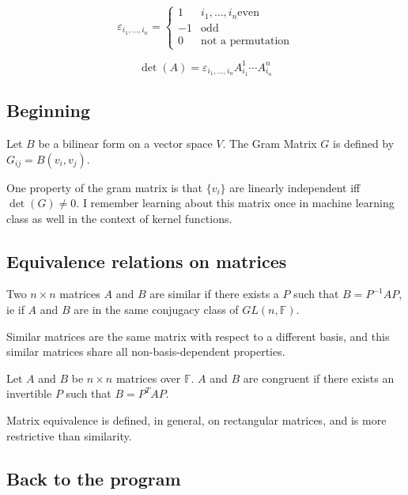 \documentclass[12pt,letterpaper,titlepage,twoside]{article}
\begin{document}
\begin{definition}
  \[ε_{i_1,…,i_n}=\begin{cases}1 & i_1,…,i_n \text{even} \\ -1 & \text{odd} \\ 0 & \text{not a permutation}\end{cases}\]
\end{definition}

\begin{example}
  \[\det(A)=ε_{i_1,…,i_n}A^1_{i_1}⋯ A^n_{i_n}\]
\end{example}

\subsection{Beginning}

\begin{definition}
Let $B$ be a bilinear form on a vector space $V$.
The Gram Matrix $G$ is defined by $G_{ij}=B(v_i,v_j)$.
\end{definition}

One property of the gram matrix is that $\{v_i\}$ are linearly independent iff $\det(G)≠0$.
I remember learning about this matrix once in machine learning class as well in the context of kernel functions.

\subsection{Equivalence relations on matrices}

\begin{definition}
Two $n×n$ matrices $A$ and $B$ are similar if there exists a $P$ such that $B=P^{-1}AP$, ie if $A$ and $B$ are in the same conjugacy class of $GL(n,𝔽)$. 
\end{definition}

Similar matrices are the same matrix with respect to a different basis, and this similar matrices share all non-basis-dependent properties.

\begin{definition}
Let $A$ and $B$ be $n×n$ matrices over $𝔽$.
$A$ and $B$ are congruent if there exists an invertible $P$ such that $B=P^{T}AP$.
\end{definition}

Matrix equivalence is defined, in general, on rectangular matrices, and is more restrictive than similarity.

\subsection{Back to the program}
\end{document}
